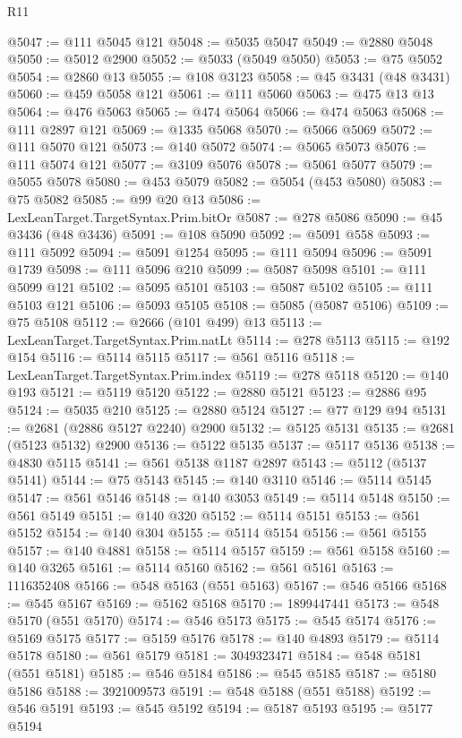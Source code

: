 \begin{lexlean}{R11}
\begin{coremodule}
@5047 := @111 @5045 @121
@5048 := @5035 @5047
@5049 := @2880 @5048
@5050 := @5012 @2900
@5052 := @5033 (@5049 @5050)
@5053 := @75 @5052
@5054 := @2860 @13
@5055 := @108 @3123
@5058 := @45 @3431 (@48 @3431)
@5060 := @459 @5058 @121
@5061 := @111 @5060
@5063 := @475 @13 @13
@5064 := @476 @5063
@5065 := @474 @5064
@5066 := @474 @5063
@5068 := @111 @2897 @121
@5069 := @1335 @5068
@5070 := @5066 @5069
@5072 := @111 @5070 @121
@5073 := @140 @5072
@5074 := @5065 @5073
@5076 := @111 @5074 @121
@5077 := @3109 @5076
@5078 := @5061 @5077
@5079 := @5055 @5078
@5080 := @453 @5079
@5082 := @5054 (@453 @5080)
@5083 := @75 @5082
@5085 := @99 @20 @13
@5086 := LexLeanTarget.TargetSyntax.Prim.bitOr
@5087 := @278 @5086
@5090 := @45 @3436 (@48 @3436)
@5091 := @108 @5090
@5092 := @5091 @558
@5093 := @111 @5092
@5094 := @5091 @1254
@5095 := @111 @5094
@5096 := @5091 @1739
@5098 := @111 @5096 @210
@5099 := @5087 @5098
@5101 := @111 @5099 @121
@5102 := @5095 @5101
@5103 := @5087 @5102
@5105 := @111 @5103 @121
@5106 := @5093 @5105
@5108 := @5085 (@5087 @5106)
@5109 := @75 @5108
@5112 := @2666 (@101 @499) @13
@5113 := LexLeanTarget.TargetSyntax.Prim.natLt
@5114 := @278 @5113
@5115 := @192 @154
@5116 := @5114 @5115
@5117 := @561 @5116
@5118 := LexLeanTarget.TargetSyntax.Prim.index
@5119 := @278 @5118
@5120 := @140 @193
@5121 := @5119 @5120
@5122 := @2880 @5121
@5123 := @2886 @95
@5124 := @5035 @210
@5125 := @2880 @5124
@5127 := @77 @129 @94
@5131 := @2681 (@2886 @5127 @2240) @2900
@5132 := @5125 @5131
@5135 := @2681 (@5123 @5132) @2900
@5136 := @5122 @5135
@5137 := @5117 @5136
@5138 := @4830 @5115
@5141 := @561 @5138 @1187 @2897
@5143 := @5112 (@5137 @5141)
@5144 := @75 @5143
@5145 := @140 @3110
@5146 := @5114 @5145
@5147 := @561 @5146
@5148 := @140 @3053
@5149 := @5114 @5148
@5150 := @561 @5149
@5151 := @140 @320
@5152 := @5114 @5151
@5153 := @561 @5152
@5154 := @140 @304
@5155 := @5114 @5154
@5156 := @561 @5155
@5157 := @140 @4881
@5158 := @5114 @5157
@5159 := @561 @5158
@5160 := @140 @3265
@5161 := @5114 @5160
@5162 := @561 @5161
@5163 := 1116352408
@5166 := @548 @5163 (@551 @5163)
@5167 := @546 @5166
@5168 := @545 @5167
@5169 := @5162 @5168
@5170 := 1899447441
@5173 := @548 @5170 (@551 @5170)
@5174 := @546 @5173
@5175 := @545 @5174
@5176 := @5169 @5175
@5177 := @5159 @5176
@5178 := @140 @4893
@5179 := @5114 @5178
@5180 := @561 @5179
@5181 := 3049323471
@5184 := @548 @5181 (@551 @5181)
@5185 := @546 @5184
@5186 := @545 @5185
@5187 := @5180 @5186
@5188 := 3921009573
@5191 := @548 @5188 (@551 @5188)
@5192 := @546 @5191
@5193 := @545 @5192
@5194 := @5187 @5193
@5195 := @5177 @5194

\end{coremodule}
\end{lexlean}
